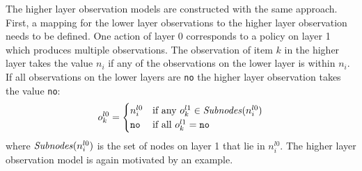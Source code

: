 The higher layer observation models are constructed with the same approach. First, a mapping for the lower layer observations to the higher layer observation needs to be defined. One action of layer 0 corresponds to a policy on layer 1 which produces multiple observations. The observation of item $k$ in the higher layer takes the value $n_i$ if any of the observations on the lower layer is within $n_i$. If all observations on the lower layers are \texttt{no} the higher layer observation takes the value \texttt{no}:
\begin{equation}
    o_k^{l0} = \begin{cases}
    n_i^{l0} &\text{if any }o_k^{l1}\in \mathit{Subnodes}(n_i^{l0})\\
    \texttt{no} &\text{if all }o_k^{l1}=\texttt{no}
    \end{cases}
\end{equation}
where $\mathit{Subnodes}(n_i^{l0})$ is the set of nodes on layer 1 that lie in $n_i^{l0}$. The higher layer observation model is again motivated by an example.
